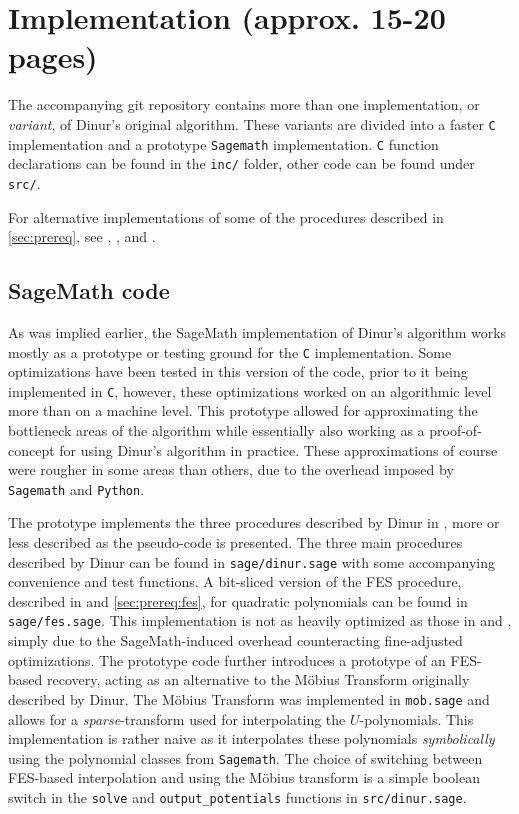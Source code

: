 \section{Implementation (approx. 15-20 pages)} \label{sec:impl}
The accompanying git repository contains more than one implementation, or \textit{variant}, of Dinur's original algorithm. These variants are divided into a faster \texttt{C} implementation and a prototype \texttt{Sagemath} implementation. \texttt{C} function declarations can be found in the \texttt{inc/} folder, other code can be found under \texttt{src/}.

For alternative implementations of some of the procedures described in \cref{sec:prereq}, see \cite{cryptoeprint:2010/313}, \cite{cryptoeprint:2013/436}, and \cite{cryptoeprint:2022/214}.

\subsection{SageMath code} \label{sec:impl:sage}
As was implied earlier, the SageMath implementation of Dinur's algorithm works mostly as a prototype or testing ground for the \texttt{C} implementation. Some optimizations have been tested in this version of the code, prior to it being implemented in \texttt{C}, however, these optimizations worked on an algorithmic level more than on a machine level. This prototype allowed for approximating the bottleneck areas of the algorithm while essentially also working as a proof-of-concept for using Dinur's algorithm in practice. These approximations of course were rougher in some areas than others, due to the overhead imposed by \texttt{Sagemath} and \texttt{Python}.

The prototype implements the three procedures described by Dinur in \cite{cryptoeprint:2021/578}, more or less described as the pseudo-code is presented. The three main procedures described by Dinur can be found in \texttt{sage/dinur.sage} with some accompanying convenience and test functions. A bit-sliced version of the FES procedure, described in \cite{cryptoeprint:2010/313} and \cref{sec:prereq:fes}, for quadratic polynomials can be found in \texttt{sage/fes.sage}. This implementation is not as heavily optimized as those in \cite{cryptoeprint:2010/313} and \cite{cryptoeprint:2013/436}, simply due to the SageMath-induced overhead counteracting fine-adjusted optimizations. The prototype code further introduces a prototype of an FES-based recovery, acting as an alternative to the Möbius Transform originally described by Dinur. The Möbius Transform was implemented in \texttt{mob.sage} and allows for a \textit{sparse}-transform used for interpolating the $U$-polynomials. This implementation is rather naive as it interpolates these polynomials \textit{symbolically} using the polynomial classes from \texttt{Sagemath}. The choice of switching between FES-based interpolation and using the Möbius transform is a simple boolean switch in the \texttt{solve} and \texttt{output\_potentials} functions in \texttt{src/dinur.sage}.  


